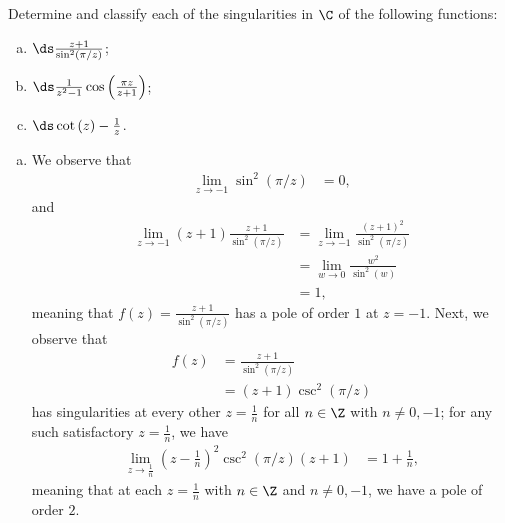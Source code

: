 \documentclass[10pt]{mypackage}
\begin{document}
\RaggedRight
\begin{problem}[Problem 1]
  Determine and classify each of the singularities in $\C$ of the following functions:
  \begin{enumerate}[(a)]
    \item $\ds \frac{z+1}{\sin^2\left( \pi/z \right)}$;
    \item $\ds \frac{1}{z^2 - 1} \cos\left( \frac{\pi z}{z+1} \right)$;
    \item $\ds \cot\left( z \right) - \frac{1}{z}$.
  \end{enumerate}
\end{problem}
\begin{solution}\hfill
  \begin{enumerate}[(a)]
    \item We observe that
      \begin{align*}
        \lim_{z\rightarrow -1} \sin^2\left( \pi/z \right) &= 0,
      \end{align*}
      and
      \begin{align*}
        \lim_{z\rightarrow -1} \left( z+1 \right)\frac{z+1}{\sin^2\left( \pi/z \right)} &= \lim_{z\rightarrow -1} \frac{\left( z+1 \right)^2}{\sin^2\left( \pi/z \right)}\\
                                                                                        &= \lim_{w\rightarrow 0} \frac{w^2}{\sin^2\left( w \right)}\\
                                                                                        &= 1,
      \end{align*}
      meaning that $f(z) = \frac{z+1}{\sin^2\left( \pi/z \right)}$ has a pole of order $1$ at $z = -1$. Next, we observe that
      \begin{align*}
        f(z) &= \frac{z+1}{\sin^2\left( \pi/z \right)}\\
             &= \left( z+1 \right)\csc^2\left( \pi/z \right)
      \end{align*}
      has singularities at every other $ z =  \frac{1}{n} $ for all $n \in\Z$ with $n\neq 0,-1$; for any such satisfactory $z = \frac{1}{n}$, we have
      \begin{align*}
        \lim_{z\rightarrow \frac{1}{n}} \left( z - \frac{1}{n} \right)^2\csc^2\left( \pi/z \right) \left( z+1 \right) &= 1 + \frac{1}{n},
      \end{align*}
      meaning that at each $z = \frac{1}{n}$ with $n\in\Z$ and $n\neq 0,-1$, we have a pole of order $2$.\newline


\end{enumerate}
\end{solution}
\end{document}
